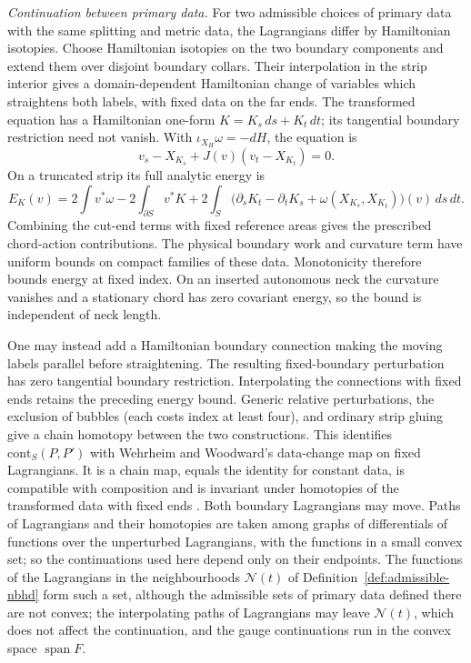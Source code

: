 \documentclass[11pt]{amsart}
\theoremstyle{definition}
\theoremstyle{remark}
\theoremstyle{plain}
\numberwithin{equation}{section}
\begin{document}
\emph{Continuation between primary data.} For two admissible choices of primary data
with the same splitting and metric data, the Lagrangians differ by Hamiltonian isotopies.
Choose Hamiltonian isotopies on the two boundary components and extend them
over disjoint boundary collars. Their interpolation in the strip interior
gives a domain-dependent Hamiltonian change of variables which straightens
both labels, with fixed data on the far ends. The transformed equation
has a Hamiltonian one-form $K=K_s\,ds+K_t\,dt$; its tangential boundary
restriction need not vanish. With $\iota_{X_H}\omega=-dH$, the equation is
\[
v_s-X_{K_s}+J(v)(v_t-X_{K_t})=0.
\]
On a truncated strip its full analytic energy is
\[
E_K(v)=2\int v^*\omega-2\int_{\partial S}v^*K
 +2\int_S\bigl(\partial_sK_t-\partial_tK_s
                   +\omega(X_{K_s},X_{K_t})\bigr)(v)\,ds\,dt.
\]
Combining the cut-end terms with fixed reference areas gives the prescribed
chord-action contributions. The physical
boundary work and curvature term have uniform bounds on compact families
of these data. Monotonicity therefore bounds energy at fixed index.
On an inserted autonomous neck the curvature vanishes and a stationary
chord has zero covariant energy, so the bound is independent of neck length.

One may instead add a Hamiltonian boundary connection making the moving
labels parallel before straightening. The resulting fixed-boundary
perturbation has zero tangential boundary restriction. Interpolating the
connections with fixed ends retains the preceding energy bound. Generic
relative perturbations, the exclusion of bubbles (each costs index at least four), and
ordinary strip gluing give a chain homotopy between the two constructions. This
identifies $\mathrm{cont}_S(P,P')$ with Wehrheim and Woodward's data-change
map on fixed Lagrangians. It is a chain map, equals
the identity for constant data, is compatible with composition and is
invariant under homotopies of the transformed data with fixed ends
\cite[Theorems~3.9, 3.13, 4.1, 4.2 and Example~2.6]{WW-relative}. Both boundary
Lagrangians may move. Paths of Lagrangians and their homotopies are taken among graphs of
differentials of functions over the unperturbed Lagrangians, with the functions in a small
convex set; so the continuations used here depend only on their
endpoints. The functions of the Lagrangians in the neighbourhoods $\mathcal N(t)$ of
Definition~\ref{def:admissible-nbhd} form such a set, although the admissible sets of primary
data defined there are not convex; the interpolating paths of Lagrangians may leave
$\mathcal N(t)$, which does not affect the continuation, and the gauge continuations run in the
convex space $\operatorname{span}F$.
\end{document}
